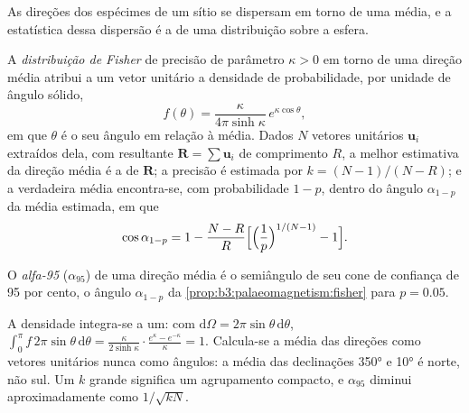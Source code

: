 As direções dos espécimes de um sítio se dispersam em torno de uma média, e a
estatística dessa dispersão é a de uma distribuição sobre a esfera.

\begin{proposition}\label{prop:b3:palaeomagnetism:fisher}
A \emph{distribuição de Fisher} de precisão
de parâmetro $\kappa > 0$ em torno de uma direção média atribui a um vetor unitário a
densidade de probabilidade, por unidade de ângulo sólido,
\[
  f(\theta) = \frac{\kappa}{4\pi\sinh\kappa}\,e^{\kappa\cos\theta},
\]
em que $\theta$ é o seu ângulo em relação à média. Dados $N$ vetores unitários $\mathbf u_i$
extraídos dela, com resultante $\mathbf R = \sum\mathbf u_i$ de comprimento $R$, a
melhor estimativa da direção média é a de $\mathbf R$; a precisão é
estimada por $k = (N - 1)/(N - R)$; e a verdadeira média encontra-se, com probabilidade
$1 - p$, dentro do ângulo $\alpha_{1-p}$ da média estimada, em que
\[
  \cos\alpha_{1-p} = 1 - \frac{N - R}{R}\Bigl[\Bigl(\frac1p\Bigr)^{1/(N-1)} - 1\Bigr].
\]
\end{proposition}
\admitted

\begin{definition}[Alfa-95]\label{def:b3:palaeomagnetism:a95}
O \emph{alfa-95} ($\alpha_{95}$) de uma direção média é o
semiângulo de seu cone de confiança de 95 por cento, o ângulo $\alpha_{1-p}$ da
\cref{prop:b3:palaeomagnetism:fisher} para $p = 0.05$.
\end{definition}

A densidade integra-se a um: com $\mathrm d\Omega = 2\pi\sin\theta\,\mathrm
d\theta$, $\int_0^\pi f\,2\pi\sin\theta\,\mathrm d\theta =
\frac{\kappa}{2\sinh\kappa}\cdot\frac{e^\kappa - e^{-\kappa}}{\kappa} = 1$. Calcula-se a média das direções como vetores unitários
nunca como ângulos: a média das declinações \ang{350} e \ang{10} é
norte, não sul. Um $k$ grande significa um agrupamento compacto, e $\alpha_{95}$ diminui
aproximadamente como $1/\sqrt{kN}$.

